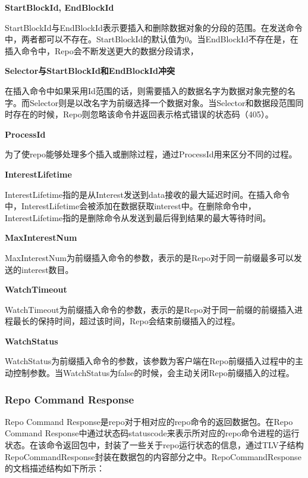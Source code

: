 \textbf{StartBlockId, EndBlockId}

StartBlockId与EndBlockId表示要插入和删除数据对象的分段的范围。在发送命令中，两者都可以不存在。StartBlockId的默认值为0。当EndBlockId不存在是，在插入命令中，Repo会不断发送更大的数据分段请求，

\textbf{Selector与StartBlockId和EndBlockId冲突}

在插入命令中如果采用Id范围的话，则需要插入的数据名字为数据对象完整的名字。而Selector则是以改名字为前缀选择一个数据对象。当Selector和数据段范围同时存在的时候，Repo则忽略该命令并返回表示格式错误的状态码（405）。

\textbf{ProcessId}

为了使repo能够处理多个插入或删除过程，通过ProcessId用来区分不同的过程。

\textbf{InterestLifetime}

InterestLifetime指的是从Interest发送到data接收的最大延迟时间。在插入命令中，InterestLifetime会被添加在数据获取interest中。在删除命令中，InterestLifetime指的是删除命令从发送到最后得到结果的最大等待时间。

\textbf{MaxInterestNum}

MaxInterestNum为前缀插入命令的参数，表示的是Repo对于同一前缀最多可以发送的interest数目。

\textbf{WatchTimeout}

WatchTimeout为前缀插入命令的参数，表示的是Repo对于同一前缀的前缀插入进程最长的保持时间，超过该时间，Repo会结束前缀插入的过程。

\textbf{WatchStatus}

WatchStatus为前缀插入命令的参数，该参数为客户端在Repo前缀插入过程中的主动控制参数。当WatchStatus为false的时候，会主动关闭Repo前缀插入的过程。

\subsubsection{Repo Command Response}
Repo Command Response是repo对于相对应的repo命令的返回数据包。在Repo Command Response中通过状态码statuscode来表示所对应的repo命令进程的运行状态。在该命令返回包中，封装了一些关于repo运行状态的信息，通过TLV子结构RepoCommandResponse封装在数据包的内容部分之中。RepoCommandResponse的文档描述结构如下所示：

